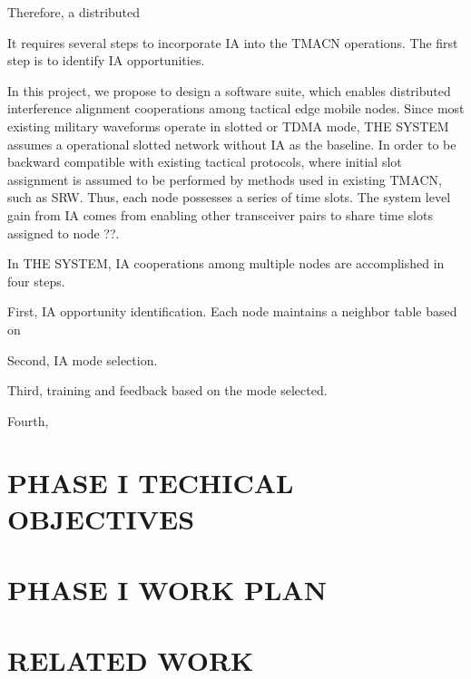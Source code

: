 \documentclass[letterpaper,11pt,onecolumn]{article}
\begin{document}
Therefore, a distributed 





It requires several steps to incorporate IA into the TMACN operations. The first step is to identify IA opportunities. 

In this project, we propose to design a software suite, which enables distributed interference alignment cooperations among tactical edge mobile nodes.  Since most existing military waveforms operate in slotted or TDMA mode, THE SYSTEM assumes a operational slotted network without IA as the baseline. In order to be backward compatible with existing tactical protocols,  where initial slot assignment is assumed to be performed by methods used in existing TMACN, such as SRW. Thus, each node possesses a series of time slots. The system level gain from IA comes from enabling other transceiver pairs to share time slots assigned to node ??. 

In THE SYSTEM, IA cooperations among multiple nodes are accomplished in four steps. 

First, IA opportunity identification. Each node maintains a neighbor table based on 

Second, IA mode selection.

Third, training and feedback based on the mode selected.

Fourth, 


\section{PHASE I TECHICAL OBJECTIVES}

\section{PHASE I WORK PLAN}

\section{RELATED WORK}
\end{document}
